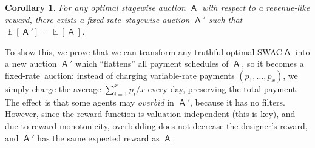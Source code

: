 \documentclass[11pt,letterpaper]{article}
\newcommand{\sqbr}[1]{\left[ #1 \right]}
\newcommand{\fr}{fixed-rate\xspace}
\newcommand{\swac}{SWAC\xspace}
\DeclareMathOperator*{\E}{\bb{E}}
\newcommand{\bb}[1]{\mathbb{#1}}
\DeclareMathOperator{\A}{\auc{A}}
\theoremstyle{plain}
\newtheorem{corollary}[theorem]{Corollary}
\newcommand{\auc}[1]{\mathsf{#1}}
\begin{document}
\begin{corollary}\label{corollary:rev-like-fr-wlog}
For any optimal stagewise auction $\A$ with respect to a revenue-like reward, there exists a \fr\ stagewise auction $\A'$ such that $\E\sqbr{\A'}=\E\sqbr{\A}$. 
\end{corollary}
To show this,
we prove that
we can transform any truthful optimal \swac $\A$ into a new auction $\A'$ which ``flattens'' all payment schedules of $\A$,
so it becomes a \fr\ auction:
instead of charging variable-rate payments $(p_1,\ldots,p_x)$,
we simply charge the average $\sum_{i = 1}^x p_i / x$ every day,
preserving the total payment.
The effect is that some agents may \emph{overbid} in $\A'$, because it has no filters.
However, since the reward function is valuation-independent (this is key), and due to reward-monotonicity, overbidding does not decrease the designer's reward,
and $\A'$ has the same expected reward as $\A$.
\end{document}
